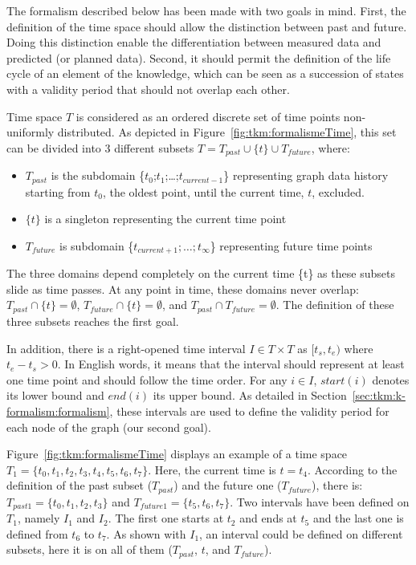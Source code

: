 The formalism described below has been made with two goals in mind.
First, the definition of the time space should allow the distinction between past and future. 
Doing this distinction enable the differentiation between measured data and predicted (or planned data).
Second, it should permit the definition of the life cycle of an element of the \gls{knowledge}, which can be seen as a succession of states with a validity period that should not overlap each other.

Time space $T$ is considered as an ordered discrete set of time points non-uniformly distributed. 
As depicted in Figure~\ref{fig:tkm:formalismeTime}, this set can be divided into 3 different subsets $T = T_{past} \cup \{t\} \cup T_{future}$, where:   \begin{itemize}  \item $T_{past}$ is the subdomain \{$t_{0}$;$t_{1}$;\ldots;$t_{current-1}$\}  representing graph data history starting from $t_0$, the oldest point, until the current time, $t$, excluded.

\item $\{t\}$ is a singleton representing the current time  point  \item $T_{future}$ is subdomain \{$t_{current+1};\ldots;t_{\infty}$\} representing future time points  \end{itemize}
The three domains depend completely on the current time \{t\} as these subsets slide as time passes. 
At any point in time, these domains never overlap: $T_{past} \cap \{t\} = \emptyset$, $T_{future} \cap \{t\} =  \emptyset$, and $T_{past} \cap T_{future} = \emptyset$.
The definition of these three subsets reaches the first goal.

In addition, there is a right-opened time interval $I \in T \times T$ as $[t_s, t_e)$ where $t_e - t_s > 0$.
In English words, it means that the interval should represent at least one time point and should follow the time order. 
For any $i \in I$, $start(i)$ denotes its lower bound and $end(i)$ its upper bound.
As detailed in Section~\ref{sec:tkm:k-formalism:formalism}, these intervals are used to define the validity period for each node of the graph (our second goal).

Figure~\ref{fig:tkm:formalismeTime} displays an example of a time space $T_1 = \{t_0, t_1, t_2, t_3, t_4, t_5, t_6, t_7\}$.
Here, the current time is $t = t_4$.
According to the definition of the past subset ($T_{past}$) and the future one ($T_{future}$), there is: $T_{past1} =  \{t_0, t_1, t_2, t_3\}$ and $T_{future1} = \{t_5, t_6, t_7\}$.
Two intervals have been defined on $T_1$, namely $I_1$ and $I_2$.
The first one starts at $t_2$ and ends at $t_5$ and the last one is defined from $t_6$ to $t_7$.
As shown with $I_1$, an interval could be defined on different subsets, here it is on all of them ($T_{past}$, $t$, and $T_{future}$).

